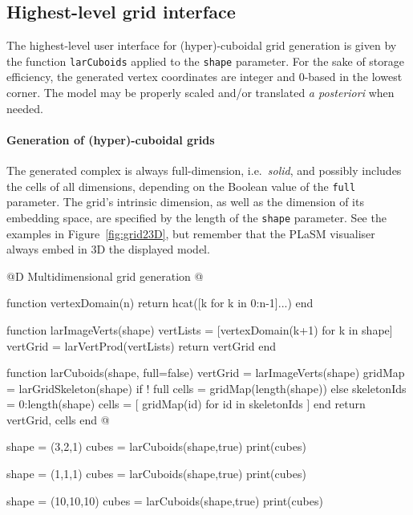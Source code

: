 \subsection{Highest-level grid interface}

The highest-level user interface for (hyper)-cuboidal grid generation is given by the function \texttt{larCuboids}  applied to the \texttt{shape} parameter.  
For the sake of storage efficiency, the generated vertex coordinates are integer and 0-based in the lowest corner. The model may be properly scaled and/or translated \emph{a posteriori} when needed.

\paragraph{Generation of (hyper)-cuboidal grids}

The generated complex is always full-dimension, i.e.~\emph{solid}, and possibly includes the cells of all dimensions, depending on the Boolean value of the \texttt{full} parameter.
The grid's intrinsic dimension, as well as the dimension of its embedding space, are specified by the length of the \texttt{shape} parameter. See the examples in Figure~\ref{fig:grid23D}, but remember that the PLaSM visualiser always embed in 3D the displayed model. 

@D Multidimensional grid generation
@{function vertexDomain(n)
	return hcat([k for k in 0:n-1]...)
end

function larImageVerts(shape)
	vertLists = [vertexDomain(k+1) for k in shape]
	vertGrid = larVertProd(vertLists)
	return vertGrid
end

function larCuboids(shape, full=false)
	vertGrid = larImageVerts(shape)
	gridMap = larGridSkeleton(shape)
	if ! full
		cells = gridMap(length(shape))
	else
		skeletonIds = 0:length(shape)
		cells = [ gridMap(id) for id in skeletonIds ]
	end
	return vertGrid, cells
end
@}




shape = (3,2,1)
cubes = larCuboids(shape,true)
print(cubes)

shape = (1,1,1)
cubes = larCuboids(shape,true)
print(cubes)

shape = (10,10,10)
cubes = larCuboids(shape,true)
print(cubes)


